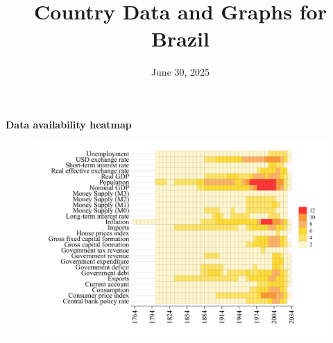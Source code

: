 \documentclass[12pt,a4paper,landscape]{article}
\begin{document}
\title{\Large Country Data and Graphs for Brazil}
\date{June 30, 2025}
\maketitle
\thispagestyle{empty}

\clearpage
\setcounter{page}{1}
\hypersetup{colorlinks=true,linkcolor=blue,linktoc=all}
\label{toc}
\tableofcontents
\thispagestyle{empty}
\clearpage
{}
{}
\begin{center}
{\Large\bfseries Data availability heatmap}
\end{center}
\vspace{1cm}
\begin{figure}[H]
\centering
\includegraphics[width=\textwidth,height=0.8\textheight,keepaspectratio]{graphs/BRA_heatmap.pdf}
\end{figure}
\setcounter{page}{3}
\end{document}
